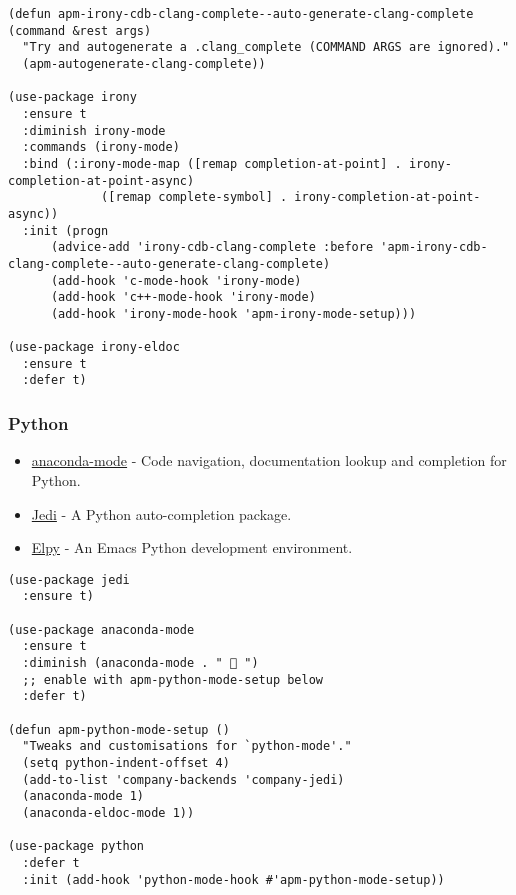 \documentclass[11pt]{article}
\begin{document}
\begin{verbatim}
(defun apm-irony-cdb-clang-complete--auto-generate-clang-complete (command &rest args)
  "Try and autogenerate a .clang_complete (COMMAND ARGS are ignored)."
  (apm-autogenerate-clang-complete))

(use-package irony
  :ensure t
  :diminish irony-mode
  :commands (irony-mode)
  :bind (:irony-mode-map ([remap completion-at-point] . irony-completion-at-point-async)
			 ([remap complete-symbol] . irony-completion-at-point-async))
  :init (progn
	  (advice-add 'irony-cdb-clang-complete :before 'apm-irony-cdb-clang-complete--auto-generate-clang-complete)
	  (add-hook 'c-mode-hook 'irony-mode)
	  (add-hook 'c++-mode-hook 'irony-mode)
	  (add-hook 'irony-mode-hook 'apm-irony-mode-setup)))

(use-package irony-eldoc
  :ensure t
  :defer t)
\end{verbatim}

\subsubsection{Python}
\label{sec-1-7-2}
\begin{itemize}
\item \href{https://github.com/proofit404/anaconda-mode}{anaconda-mode} - Code navigation, documentation lookup and completion for Python.
\item \href{https://github.com/tkf/emacs-jedi}{Jedi} - A Python auto-completion package.
\item \href{https://github.com/jorgenschaefer/elpy}{Elpy} - An Emacs Python development environment.
\end{itemize}

\begin{verbatim}
(use-package jedi
  :ensure t)

(use-package anaconda-mode
  :ensure t
  :diminish (anaconda-mode . " 🐍 ")
  ;; enable with apm-python-mode-setup below
  :defer t)

(defun apm-python-mode-setup ()
  "Tweaks and customisations for `python-mode'."
  (setq python-indent-offset 4)
  (add-to-list 'company-backends 'company-jedi)
  (anaconda-mode 1)
  (anaconda-eldoc-mode 1))

(use-package python
  :defer t
  :init (add-hook 'python-mode-hook #'apm-python-mode-setup))
\end{verbatim}
\end{document}
